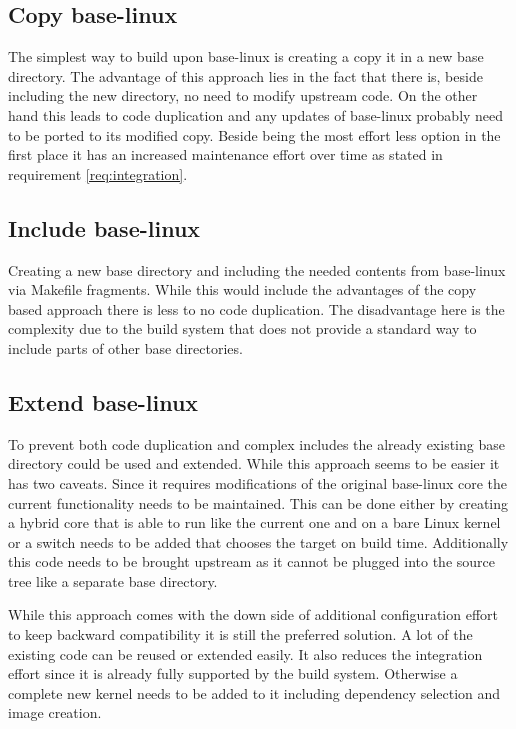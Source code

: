 \documentclass[
a4paper,
12pt,
notitlepage,
parskip=half,
DIV=11,
]{scrbook}
\begin{document}
		\subsection{Copy base-linux}
		The simplest way to build upon base-linux is creating a copy it in a new base directory.
		The advantage of this approach lies in the fact that there is, beside including the new directory, no need to modify upstream code.
		On the other hand this leads to code duplication and any updates of base-linux probably need to be ported to its modified copy.
		Beside being the most effort less option in the first place it has an increased maintenance effort over time as stated in requirement \ref{req:integration}.
		
		\subsection{Include base-linux}
		Creating a new base directory and including the needed contents from base-linux via Makefile fragments.
		While this would include the advantages of the copy based approach there is less to no code duplication.
		The disadvantage here is the complexity due to the build system that does not provide a standard way to include parts of other base directories.
		
		\subsection{Extend base-linux}
		To prevent both code duplication and complex includes the already existing base directory could be used and extended.
		While this approach seems to be easier it has two caveats.
		Since it requires modifications of the original base-linux core the current functionality needs to be maintained.
		This can be done either by creating a hybrid core that is able to run like the current one and on a bare Linux kernel or a switch needs to be added that chooses the target on build time.
		Additionally this code needs to be brought upstream as it cannot be plugged into the source tree like a separate base directory.
		
		While this approach comes with the down side of additional configuration effort to keep backward compatibility it is still the preferred solution.
		A lot of the existing code can be reused or extended easily.
		It also reduces the integration effort since it is already fully supported by the build system.
		Otherwise a complete new kernel needs to be added to it including dependency selection and image creation.
	
\end{document}
